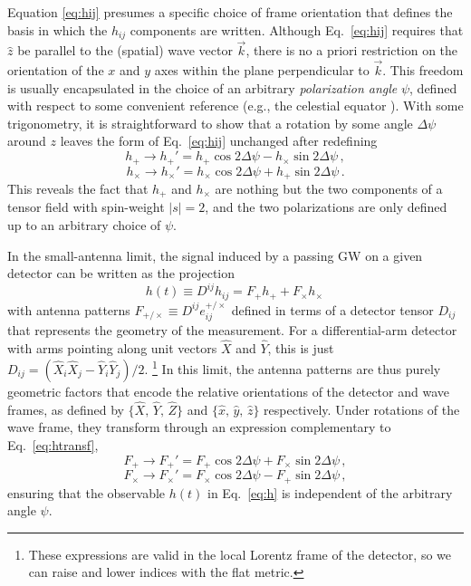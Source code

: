 \documentclass[aps,prd,twocolumn,superscriptaddress,preprintnumbers,floatfix,nofootinbib]{revtex4-2}
\newcommand{\beq}{\begin{equation}}
\newcommand{\eeq}{\end{equation}}
\newcommand*{\eq}[1]{Eq.~\eqref{eq:#1}}
\begin{document}
Equation \eqref{eq:hij} presumes a specific choice of frame orientation that defines the basis in which the $h_{ij}$ components are written.
Although \eq{hij} requires that $\hat{z}$ be parallel to the (spatial) wave vector $\vec{k}$, there is no a priori restriction on the orientation of the $x$ and $y$ axes within the plane perpendicular to $\vec{k}$.
This freedom is usually encapsulated in the choice of an arbitrary \emph{polarization angle} $\psi$, defined with respect to some convenient reference (e.g., the celestial equator \cite{LALSuite:wave}).
With some trigonometry, it is straightforward to show that a rotation by some angle $\Delta \psi$ around $z$ leaves the form of \eq{hij} unchanged after redefining
\beq \label{eq:htransf}
h_+ \rightarrow h_+' = h_+ \cos 2\Delta \psi - h_\times \sin 2\Delta\psi \, ,
\eeq
\beq
h_\times \rightarrow h_\times' = h_\times \cos 2\Delta \psi + h_+ \sin 2\Delta\psi \, .
\eeq
This reveals the fact that $h_+$ and $h_\times$ are nothing but the two components of a tensor field with spin-weight $|s|=2$, and the two polarizations are only defined up to an arbitrary choice of $\psi$.


In the small-antenna limit, the signal induced by a passing GW on a given detector can be written as the projection
\beq \label{eq:h}
h(t) \equiv D^{ij} h_{ij} = F_+ h_+ + F_\times h_\times\, 
\eeq
with antenna patterns $F_{+/\times} \equiv D^{ij} e^{+/\times}_{ij}$ defined in terms of a detector tensor $D_{ij}$ that represents the geometry of the measurement.
For a differential-arm detector with arms pointing along unit vectors $\hat{X}$ and $\hat{Y}$, this is just $D_{ij} = (\hat{X}_i \hat{X}_j - \hat{Y}_i \hat{Y}_j)/2$.%
\footnote{These expressions are valid in the local Lorentz frame of the detector, so we can raise and lower indices with the flat metric.}
In this limit, the antenna patterns are thus purely geometric factors that encode the relative orientations of the detector and wave frames, as defined by $\{\hat{X},\, \hat{Y},\, \hat{Z}\}$ and $\{\hat{x},\, \hat{y},\, \hat{z}\}$ respectively.
Under rotations of the wave frame, they transform through an expression complementary to \eq{htransf},
\beq \label{eq:Ftransf}
F_+ \rightarrow F_+' = F_+ \cos 2\Delta \psi + F_\times \sin 2\Delta\psi \, ,
\eeq
\beq
F_\times \rightarrow F_\times' = F_\times \cos 2\Delta \psi - F_+ \sin 2\Delta\psi \, ,
\eeq
ensuring that the observable $h(t)$ in \eq{h} is independent of the arbitrary angle $\psi$.
\end{document}
